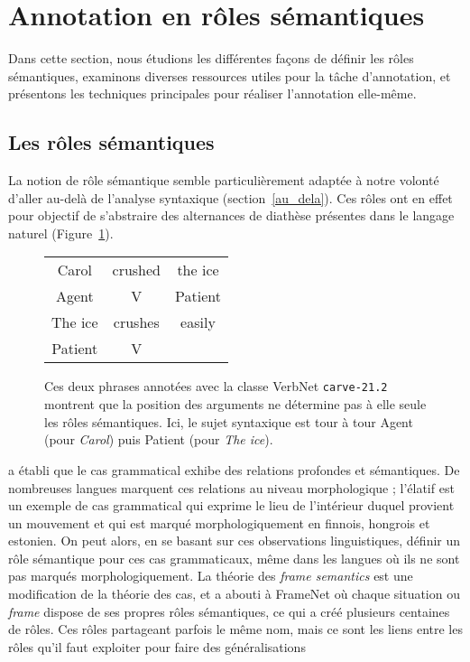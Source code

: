 \section{Annotation en rôles sémantiques}
\label{sec:srl}

Dans cette section, nous étudions les différentes façons de définir les rôles
sémantiques, examinons diverses ressources utiles pour la tâche d'annotation,
et présentons les techniques principales pour réaliser l'annotation elle-même.

\subsection{Les rôles sémantiques}
\label{subsec:roles_semantiques}

La notion de rôle sémantique semble particulièrement adaptée à notre volonté
d'aller au-delà de l'analyse syntaxique (section~\ref{au_dela}). Ces rôles ont
en effet pour objectif de s'abstraire des alternances de diathèse présentes
dans le langage naturel (Figure~\ref{fig:exemple_srl}).

\begin{figure}[ht]
    \centering
    \begin{tabular}{ccc}
        \toprule
        Carol & crushed   & the ice \\
        Agent & V         & Patient \\
        \midrule
        The ice & crushes & easily  \\
        Patient & V       &         \\
        \bottomrule
    \end{tabular}

    \caption{\label{fig:exemple_srl}Ces deux phrases annotées avec la classe
    VerbNet \texttt{carve-21.2} montrent que la position des arguments ne
détermine pas à elle seule les rôles sémantiques. Ici, le sujet syntaxique est
tour à tour Agent (pour \textit{Carol}) puis Patient (pour \textit{The ice}).}
\end{figure}

\cite{fillmore1968case} a établi que le cas grammatical exhibe des relations
profondes et sémantiques. De nombreuses langues marquent ces relations au
niveau morphologique ; l'élatif est un exemple de cas grammatical qui exprime
le lieu de l'intérieur duquel provient un mouvement et qui est marqué
morphologiquement en finnois, hongrois et estonien. On peut alors, en se basant
sur ces observations linguistiques, définir un rôle sémantique pour ces cas
grammaticaux, même dans les langues où ils ne sont pas marqués
morphologiquement. La théorie des \textit{frame semantics}
\citep{fillmore1982frame} est une modification de la théorie des cas, et a
abouti à FrameNet où chaque situation ou \textit{frame} dispose de ses propres
rôles sémantiques, ce qui a créé plusieurs centaines de rôles. Ces rôles
partageant parfois le même nom, mais ce sont les liens entre les rôles qu'il
faut exploiter pour faire des généralisations \citep{litkowski2014framenet}

